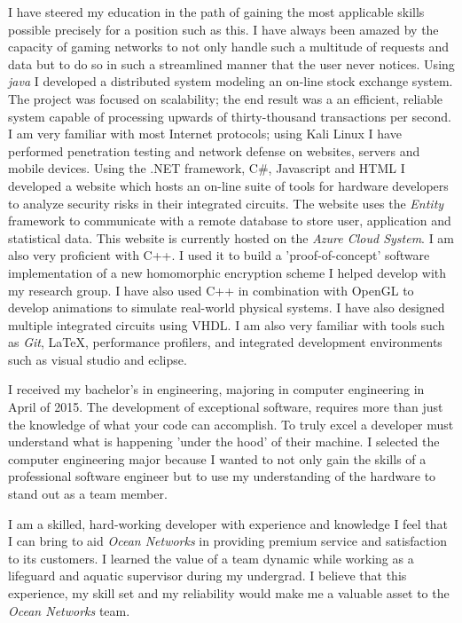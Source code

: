 \documentclass[11pt,a4paper,sans]{moderncv}        %
\newcommand{\company}{Ocean Networks}
\begin{document}
I have steered my education in the path of gaining the most applicable skills possible precisely for a position such as this. I have always been amazed by the capacity of gaming networks to not only handle such a multitude of requests and data but to do so in such a streamlined manner that the user never notices. Using \textit{java} I developed a distributed system modeling an on-line stock exchange system. The project was focused on scalability; the end result was a an efficient, reliable system capable of processing upwards of thirty-thousand transactions per second. I am very familiar with most Internet protocols; using Kali Linux I have performed penetration testing and network defense on websites, servers and mobile devices. Using the .NET framework, C\#, Javascript and HTML I developed a website which hosts an on-line suite of tools for hardware developers to analyze security risks in their integrated circuits. The website uses the \textit{Entity} framework to communicate with a remote database to store user, application and statistical data. This website is currently hosted on the \textit{Azure Cloud System}. I am also very proficient with C++. I used it to build a 'proof-of-concept' software implementation of a new homomorphic encryption scheme I helped develop with my research group. I have also used C++ in combination with OpenGL to develop animations to simulate real-world physical systems. I have also designed multiple integrated circuits using VHDL. I am also very familiar with tools such as \textit{Git}, \LaTeX, performance profilers, and integrated development environments such as visual studio and eclipse.

I received my bachelor's in engineering, majoring in computer engineering in April of 2015. The development of exceptional software, requires more than just the knowledge of what your code can accomplish. To truly excel a developer must understand what is happening 'under the hood' of their machine. I selected the computer engineering major because I wanted to not only gain the skills of a professional software engineer but to use my understanding of the hardware to stand out as a team member. 

I am a skilled, hard-working developer with experience and knowledge I feel that I can bring to aid \textit{\company} in providing premium service and satisfaction to its customers. I learned the value of a team dynamic while working as a lifeguard and aquatic supervisor during my undergrad. I believe that this experience, my skill set and my reliability would make me a valuable asset to the \textit{\company} team. 

%

\makeletterclosing
\end{document}
